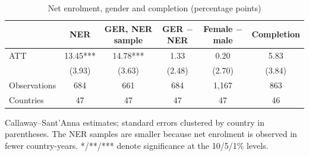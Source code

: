 \begin{table}[t]
\centering
\begin{threeparttable}
\caption{Net enrolment, gender and completion (percentage points)}
\label{tab:mechanism}
\begin{tabular}{lccccc}
\toprule
 & NER & GER, NER sample & GER $-$ NER & Female $-$ male & Completion \\
\midrule
ATT & 13.45*** & 14.78*** & 1.33 & 0.20 & 5.83 \\
 & (3.93) & (3.63) & (2.48) & (2.70) & (3.84) \\
Observations & 684 & 661 & 684 & 1,167 & 863 \\
Countries & 47 & 47 & 47 & 47 & 46 \\
\bottomrule
\end{tabular}
\begin{tablenotes}[flushleft]
\footnotesize
\item Callaway--Sant'Anna estimates; standard errors clustered by country in parentheses. The NER samples are smaller because net enrolment is observed in fewer country-years. */**/*** denote significance at the 10/5/1\% levels.
\end{tablenotes}
\end{threeparttable}
\end{table}
